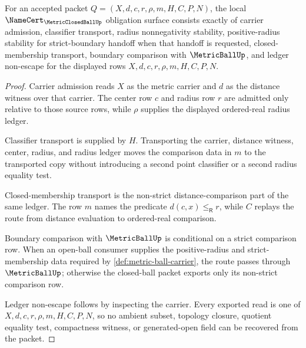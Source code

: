 
\begin{theorem}
\label{thm:metric-closed-ball-namecert-obligations}
For an accepted packet $Q=(X,d,c,r,\rho,m,H,C,P,N)$, the local $\NameCert_{\MetricClosedBallUp}$ obligation surface consists exactly of carrier admission, classifier transport, radius nonnegativity stability, positive-radius stability for strict-boundary handoff when that handoff is requested, closed-membership transport, boundary comparison with $\MetricBallUp$, and ledger non-escape for the displayed rows $X,d,c,r,\rho,m,H,C,P,N$.
\end{theorem}
\begin{proof}
Carrier admission reads $X$ as the metric carrier and $d$ as the distance witness over that carrier. The center row $c$ and radius row $r$ are admitted only relative to those source rows, while $\rho$ supplies the displayed ordered-real radius ledger.

Classifier transport is supplied by $H$. Transporting the carrier, distance witness, center, radius, and radius ledger moves the comparison data in $m$ to the transported copy without introducing a second point classifier or a second radius equality test.

Closed-membership transport is the non-strict distance-comparison part of the same ledger. The row $m$ names the predicate $d(c,x)\leq_{\mathsf R}r$, while $C$ replays the route from distance evaluation to ordered-real comparison.

Boundary comparison with $\MetricBallUp$ is conditional on a strict comparison row. When an open-ball consumer supplies the positive-radius and strict-membership data required by \autoref{def:metric-ball-carrier}, the route passes through $\MetricBallUp$; otherwise the closed-ball packet exports only its non-strict comparison row.

Ledger non-escape follows by inspecting the carrier. Every exported read is one of $X,d,c,r,\rho,m,H,C,P,N$, so no ambient subset, topology closure, quotient equality test, compactness witness, or generated-open field can be recovered from the packet.
\end{proof}

